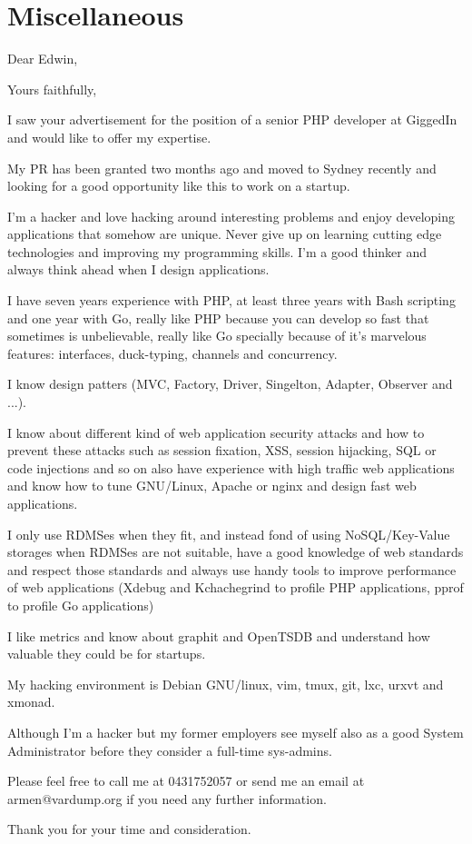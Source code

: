 \documentclass[9pt,a4paper,sans]{moderncv}   %
\begin{document}
\section{Miscellaneous}

\clearpage
{}
\date{January 01, 1984}
\opening{Dear Edwin,}
\closing{Yours faithfully,}
\makelettertitle

I saw your advertisement for the position of a senior PHP developer at
GiggedIn and would like to offer my expertise.

My PR has been granted two months ago and moved to Sydney recently
and looking for a good opportunity like this to work on a startup.

I'm a hacker and love hacking around interesting problems and
enjoy developing applications that somehow are unique. Never give up on
learning cutting edge technologies and improving my programming skills.
I'm a good thinker and always think ahead when I design applications.

I have seven years experience with PHP, at least three years with Bash
scripting and one year with Go, really like PHP because you can develop
so fast that sometimes is unbelievable, really like Go specially because
of it's marvelous features: interfaces, duck-typing, channels and concurrency.

I know design patters (MVC, Factory, Driver, Singelton, Adapter,
Observer and ...).

I know about different kind of web application security attacks and how
to prevent these attacks such as session fixation, XSS, session
hijacking, SQL or code injections and so on also have experience with high
traffic web applications and know how to tune GNU/Linux, Apache or nginx
and design fast web applications.

I only use RDMSes when they fit, and instead fond of using NoSQL/Key-Value
storages when RDMSes are not suitable, have a good knowledge of web standards
and respect those standards and always use handy tools to improve performance
of web applications (Xdebug and Kchachegrind to profile PHP applications,
pprof to profile Go applications)

I like metrics and know about graphit and OpenTSDB and understand
how valuable they could be for startups.

My hacking environment is Debian GNU/linux, vim, tmux, git, lxc, urxvt
and xmonad.

Although I'm a hacker but my former employers see myself also as a
good System Administrator before they consider a full-time sys-admins.

Please feel free to call me at 0431752057 or send me an email at armen@vardump.org
if you need any further information.

Thank you for your time and consideration.

\makeletterclosing
\end{document}
